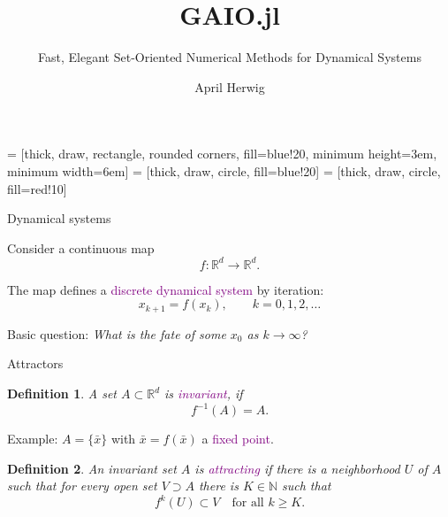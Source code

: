 \documentclass[
  english,            %
  aspectratio=169,    %
]{tumbeamer}
\title{GAIO.jl}
\subtitle{Fast, Elegant Set-Oriented Numerical Methods for Dynamical Systems}
\author{April Herwig}
\institute{\theChairName\\\theDepartmentName\\\theUniversityName}
\date{}
\newtheorem{definition}{Definition}
\newcommand{\R}{{\mathbb R}}
\newcommand{\N}{{\mathbb N}}
\renewcommand{\emph}[1]{\textcolor{purple}{#1}}
\begin{document}
 = [thick, draw, rectangle, rounded corners, fill=blue!20,
                       minimum height=3em, minimum width=6em]
 = [thick, draw, circle, fill=blue!20]
 = [thick, draw, circle, fill=red!10]

\maketitle

\begin{frame}{Dynamical systems}

Consider a continuous map
\[
f:\R^d\to \R^d.
\] 

The map defines a \emph{discrete dynamical system} by iteration:
\[
x_{k+1} = f(x_k), \qquad k=0,1,2,\ldots
\]

\begin{tcolorbox}[colback=blue!5!white,colframe=blue!75!black]
Basic question: \textit{What is the fate of some $x_0$ as $k\to\infty$?}
\end{tcolorbox}



\end{frame}

\begin{frame}{Attractors}

\begin{definition}
    A set $A\subset\R^d$ is \emph{invariant}, if
    \[
    f^{-1} (A) = A.
    \]
\end{definition}

\begin{tcolorbox}[colback=blue!5!white,colframe=blue!75!black]
Example: $A=\{\bar x\}$ with $\bar x = f(\bar x)$ a \emph{fixed point}.
\end{tcolorbox}


\begin{definition}
    An invariant set $A$ is \emph{attracting} if there is a neighborhood $U$ of $A$ such that for every open set $V\supset A$ there is $K\in\N$ such that
    \[
    f^k(U)\subset V \quad\text{for all } k\ge K.
    \]
\end{definition}

\end{frame}
\end{document}

